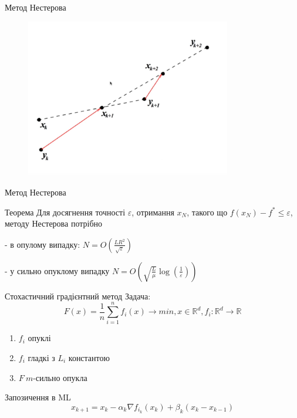 \documentclass[a4paper, 14pt]{beamer}
\begin{document}
\begin{frame}{Метод Нестерова}
    \begin{figure}
        \includegraphics[width = 0.8\textwidth]{imgs/nesterov2.png}
    \end{figure}
\end{frame}

\begin{frame}{Метод Нестерова}
    \begin{theo}{Теорема}
        Для досягнення точності $\varepsilon$, отримання 
        $x_N$, такого що $f\left(x_N\right)-f^* \leq \varepsilon$, 
        методу Нестерова потрібно
        
        
        - в опулому випадку: 
        $N=O\left(\frac{L R^2}{\sqrt{\varepsilon}}\right)$


        - у сильно опуклому випадку 
        $N=O\left(\sqrt{\frac{L}{\mu}} \log 
        \left(\frac{1}{\varepsilon}\right)\right)$ 
    \end{theo}
\end{frame}

\begin{frame}{Стохастичний градієнтний метод}
    Задача: 
    $$ F(x) = \frac{1}{n} \sum_{i = 1}^{n}f_i(x) \rightarrow min, x \in 
    \mathbb{R}^d, f_i: \mathbb{R}^d \rightarrow \mathbb{R} $$
    \begin{enumerate}
        \item $f_i$ опуклі 
        \item $f_i$ гладкі з $L_i$ константою
        \item $F \ m$-сильно опукла
    \end{enumerate}
\end{frame}

\begin{frame}{Запозичення в ML}
    $$x_{k+1} = x_k - \alpha_k \nabla f_{i_k}(x_k) + \beta_k (x_k - x_{k - 1})$$

\end{frame}
\end{document}
